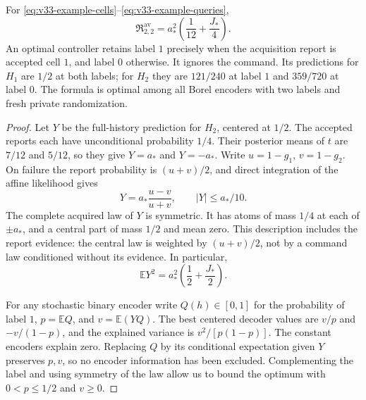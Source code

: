 \begin{theorem}\label{thm:v33-exact-example}
For \eqref{eq:v33-example-cells}--\eqref{eq:v33-example-queries},
\begin{equation}\label{eq:v33-example-value}
 \mathfrak R_{2,2}^{\mathrm{av}}
       =a_*^2\left(\frac1{12}+\frac{J_*}{4}\right).
\end{equation}
An optimal controller retains label $1$ precisely when the acquisition
report is accepted cell $1$, and label $0$ otherwise. It ignores the
command. Its predictions for $H_1$ are $1/2$ at both labels; for $H_2$
they are $121/240$ at label $1$ and $359/720$ at label $0$.
The formula is optimal among all Borel encoders with two labels and
fresh private randomization.
\end{theorem}
\begin{proof}
Let $Y$ be the full-history prediction for $H_2$, centered at $1/2$.
The accepted reports each have unconditional probability $1/4$.
Their posterior means of $t$ are $7/12$ and $5/12$, so they give
$Y=a_*$ and $Y=-a_*$. Write $u=1-g_1$, $v=1-g_2$. On failure the
report probability is $(u+v)/2$, and direct integration of the affine
likelihood gives
\[
  Y=a_*\frac{u-v}{u+v},\qquad |Y|\le a_*/10.
\]
The complete acquired law of $Y$ is symmetric. It has atoms of mass
$1/4$ at each of $\pm a_*$, and a central part of mass $1/2$ and mean
zero. This description includes the report evidence: the central
law is weighted by $(u+v)/2$, not by a command law conditioned
without its evidence. In particular,
\begin{equation}\label{eq:v33-second-moment}
 \mathbb EY^2=a_*^2\left(\frac12+\frac{J_*}{2}\right).
\end{equation}

For any stochastic binary encoder write $Q(h)\in[0,1]$ for the
probability of label $1$, $p=\mathbb EQ$, and $v=\mathbb E(YQ)$.
The best centered decoder values are $v/p$ and $-v/(1-p)$, and
the explained variance is $v^2/[p(1-p)]$. The constant encoders
explain zero. Replacing $Q$ by its conditional expectation given
$Y$ preserves $p,v$, so no encoder information has been excluded.
Complementing the label and using symmetry of the law allow us to
bound the optimum with $0<p\le1/2$ and $v\ge0$.


\end{proof}
